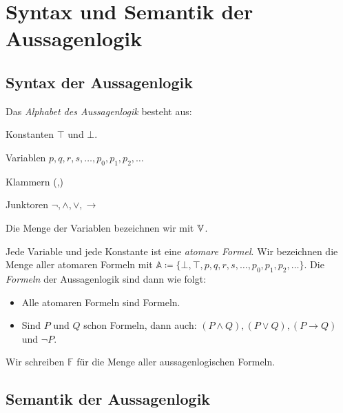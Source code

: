 \section{Syntax und Semantik der Aussagenlogik}\label{sec:syntax-und-semantik-der-aussagenlogik}

\subsection{Syntax der Aussagenlogik}\label{subsec:syntax-der-aussagenlogik}

\begin{definition}{}
    Das \emph{Alphabet des Aussagenlogik} besteht aus:
    \vspace{-\topsep}
    \begin{itemize}
        \setlength{\itemsep}{0pt}
        \setlength{\parskip}{0pt}
        \setlength{\parsep}{0pt}
        \begin{multicols}{2}
            \item Konstanten $\top$ und $\bot$.
            \item Variablen $p,q,r,s,\dots,p_0,p_1,p_2,\dots$
            \item Klammern (,)
            \item Junktoren $\neg, \land, \lor, \rightarrow$
        \end{multicols}
    \end{itemize}
    \vspace{-\topsep}
    Die Menge der Variablen bezeichnen wir mit $\mathbb{V}$.
\end{definition}

\begin{definition}{}
    Jede Variable und jede Konstante ist eine \emph{atomare Formel}.
    Wir bezeichnen die Menge aller atomaren Formeln mit $\mathbb{A} \coloneqq \{\bot, \top, p,q,r,s,\dots,p_0,p_1,p_2,\dots\}$.
    Die \emph{Formeln} der Aussagenlogik sind dann wie folgt:
    \begin{itemize}
        \item Alle atomaren Formeln sind Formeln.
        \item Sind $P$ und $Q$ schon Formeln, dann auch: $(P \land Q), (P \lor Q), (P \rightarrow Q)$ und $\neg P$.
    \end{itemize}
    Wir schreiben $\mathbb{F}$ für die Menge aller aussagenlogischen Formeln.
\end{definition}

\subsection{Semantik der Aussagenlogik}\label{subsec:semantik-der-aussagenlogik}

